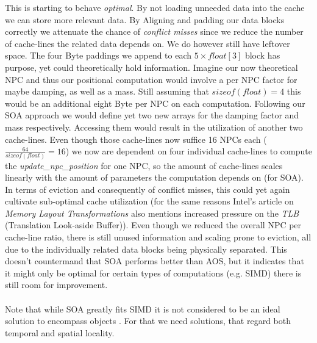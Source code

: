 This is starting to behave \textit{optimal}. By not loading unneeded data into the cache we can store more relevant data. By Aligning and padding our data blocks correctly we attenuate the chance of \textit{conflict misses} since we reduce the number of cache-lines the related data depends on. We do however still have leftover space. The four Byte paddings we append to each $5\times float[3]$ block has purpose, yet could theoretically hold information. Imagine our now theoretical NPC and thus our positional computation would involve a per NPC factor for maybe damping, as well as a mass. Still assuming that $sizeof(float) = 4$ this would be an additional eight Byte per NPC on each computation. Following our SOA approach we would define yet two new arrays for the damping factor and mass respectively. Accessing them would result in the utilization of another two cache-lines. Even though those cache-lines now suffice 16 NPCs each ($\frac{64}{sizeof(float)} = 16$) we now are dependent on four individual cache-lines to compute the \textit{update\_npc\_position} for one NPC, so the amount of cache-lines scales linearly with the amount of parameters the computation depends on (for SOA). In terms of eviction and consequently of conflict misses, this could yet again cultivate sub-optimal cache utilization (for the same reasons Intel's article on \textit{Memory Layout Transformations}  also mentions increased pressure on the \textit{TLB} (Translation Look-aside Buffer)). Even though we reduced the overall NPC per cache-line ratio, there is still unused information and scaling prone to eviction, all due to the individually related data blocks being physically separated. This doesn't countermand that SOA performs better than AOS, but it indicates that it might only be optimal for certain types of computations (e.g. SIMD) there is still room for improvement.\\\\
Note that while SOA greatly fits SIMD it is not considered to be an ideal solution to encompass objects . For that we need solutions, that regard both temporal and spatial locality. 

